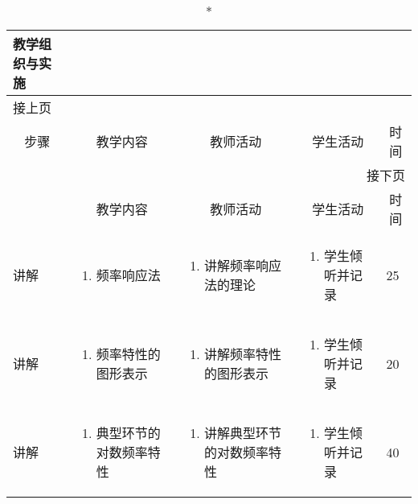 {%
\begin{landscape}

\begin{longtable}{|m{10mm}|m{50mm}|m{50mm}|m{50mm}|m{15mm}|}
\caption*{\huge 教学组织与实施}\\
\hline
\endfirsthead
\multicolumn{5}{l}{\small 接上页}\\
\hline
\multicolumn{1}{|c|}{步骤}&\multicolumn{1}{c|}{教学内容}&\multicolumn{1}{c|}{教师活动}&\multicolumn{1}{c|}{学生活动}&\multicolumn{1}{c|}{时间}\\
\hline
\endhead

\multicolumn{5}{r}{\small 接下页}\\
\endfoot
\hline
\endlastfoot
\multicolumn{1}{|c|}{步骤}&\multicolumn{1}{c|}{教学内容}&\multicolumn{1}{c|}{教师活动}&\multicolumn{1}{c|}{学生活动}&\multicolumn{1}{c|}{时间}\\\hline
讲解&\begin{enumerate}
\item 频率响应法
\end{enumerate} &\begin{enumerate}
\item 讲解频率响应法的理论
\end{enumerate} &\begin{enumerate}
\item 学生倾听并记录
\end{enumerate} &25 \\\hline
讲解&\begin{enumerate}
\item 频率特性的图形表示
\end{enumerate}
 &\begin{enumerate}
\item 讲解频率特性的图形表示
\end{enumerate} &\begin{enumerate}
\item 学生倾听并记录
\end{enumerate} &20 \\\hline
讲解&\begin{enumerate}
\item 典型环节的对数频率特性
\end{enumerate}
&\begin{enumerate}
\item 讲解典型环节的对数频率特性
\end{enumerate} &\begin{enumerate}
\item 学生倾听并记录
\end{enumerate} &40 \\\hline


\end{longtable}
\end{landscape}}
